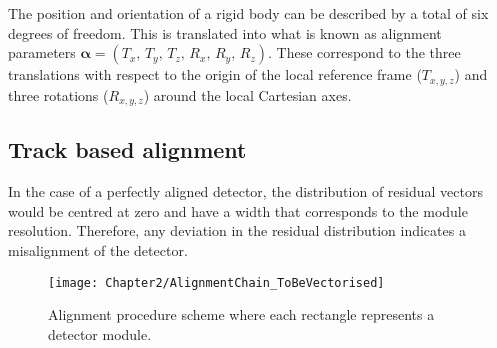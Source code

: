 The position and orientation of a rigid body can be described by a total of six degrees of freedom. 
This is translated into what is known as alignment parameters 
$\bm{\alpha} = (T_{x},\, T_{y},\, T_{z},\, R_{x},\, R_{y},\,R_{z})$. These correspond to the
three translations with respect to the origin of the local reference frame ($T_{x,y,z}$) 
and three rotations ($R_{x,y,z}$) around the local Cartesian axes. 



\subsection{Track based alignment}
In the case of a perfectly aligned detector, the distribution of residual vectors would be centred at 
zero and have a width that corresponds to the
module resolution. Therefore, any deviation in the residual distribution indicates a 
misalignment of the detector. 


\begin{figure}[h]
\centering
\texttt{[image: Chapter2/AlignmentChain\_ToBeVectorised]}
\caption{Alignment procedure scheme where each rectangle represents a detector module. 
	}
\label{fig:Chap2:Alignment:Chain}
\end{figure}

